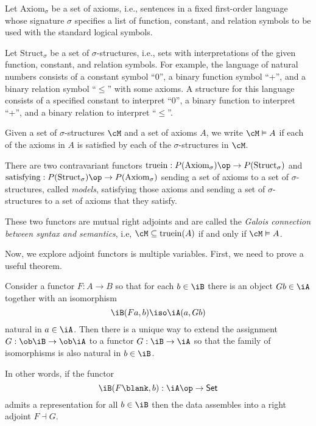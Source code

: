 \documentclass{amsart}
\begin{document}
\begin{eg}
  Let $\mathrm{Axiom}_{\sigma}$ be a set of axioms, i.e., sentences in a fixed first-order language whose signature $\sigma$ specifies a list of function, constant, and relation symbols to be used with the standard logical symbols.

  Let $\mathrm{Struct}_{\sigma}$ be a set of $\sigma$-structures, i.e., sets with interpretations of the given function, constant, and relation symbols.
  For example, the language of natural numbers consists of a constant symbol ``0'', a binary function symbol ``+'', and a binary relation symbol ``$\leq$'' with some axioms.
  A structure for this language consists of a specified constant to interpret ``0'', a binary function to interpret ``+'', and a binary relation to interpret ``$\leq$''.

  Given a set of $\sigma$-structures $\cM$ and a set of axioms $A$, we write $\cM \vDash A$ if each of the axioms in $A$ is satisfied by each of the $\sigma$-structures in $\cM$.

  There are two contravariant functors $\mathrm{truein} : P(\mathrm{Axiom}_{\sigma})\op \to P(\mathrm{Struct}_{\sigma})$ and $\mathrm{satisfying} : P(\mathrm{Struct}_{\sigma})\op \to P(\mathrm{Axiom}_{\sigma})$ sending a set of axioms to a set of $\sigma$-structures, called \emph{models}, satisfying those axioms and sending a set of $\sigma$-structures to a set of axioms that they satisfy.

  These two functors are mutual right adjoints and are called the \emph{Galois connection between syntax and semantics}, i.e, $\cM \subseteq \mathrm{truein}(A)$ if and only if $\cM \vDash A$.
\end{eg}

Now, we explore adjoint functors is multiple variables.
First, we need to prove a useful theorem.

\begin{thm}
  Consider a functor $F : A \to B$ so that for each $b \in \iB$ there is an object $Gb \in \iA$ together with an isomorphism
  \[
    \iB(Fa,b) \iso \iA(a, Gb)
  \]
  natural in $a \in \iA$.
  Then there is a unique way to extend the assignment $G : \ob\iB \to \ob\iA$ to a functor $G : \iB \to \iA$ so that the family of isomorphisms is also natural in $b \in \iB$.

  In other words, if the functor
  \[
    \iB(F\blank, b) : \iA\op \to \mathsf{Set}
  \]
  admits a representation for all $b \in \iB$ then the data assembles into a right adjoint $F \dashv G$.
\end{thm}
\end{document}
